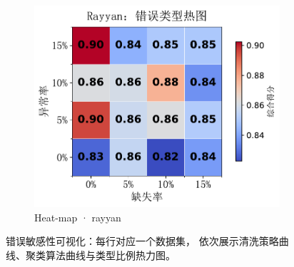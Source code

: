 \documentclass[10pt]{article} %
\numberwithin{equation}{section}
\begin{document}
\begin{figure}[htbp]
\begin{subfigure}{0.295\linewidth}
    \includegraphics[width=\linewidth]{figures/5.3.2graph/rayyan_heatmap.pdf}
    \caption{Heat-map · rayyan}
  \end{subfigure}

  \caption{错误敏感性可视化：每行对应一个数据集，
           依次展示清洗策略曲线、聚类算法曲线与类型比例热力图。}
  \label{fig:error_sense_all}
\end{figure}
\end{document}
